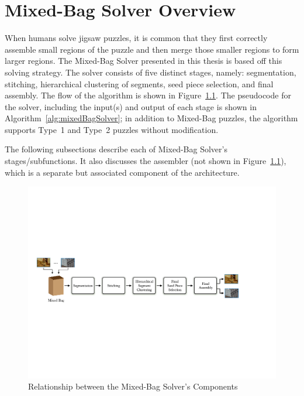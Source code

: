 \chapter{Mixed-Bag Solver Overview}\label{chap:mixedBagSolver}

When humans solve jigsaw puzzles, it is common that they first correctly assemble small regions of the puzzle and then merge those smaller regions to form larger regions.  The Mixed-Bag Solver presented in this thesis is based off this solving strategy.  The solver consists of five distinct stages, namely: segmentation, stitching, hierarchical clustering of segments, seed piece selection, and final assembly.  The flow of the algorithm is shown in Figure~\ref{fig:multipuzzleSolverArchitecture}.  The pseudocode for the solver, including the input(s) and output of each stage is shown in Algorithm~\ref{alg:mixedBagSolver}; in addition to Mixed-Bag puzzles, the algorithm supports Type~1 and Type~2 puzzles without modification. 

The following subsections describe each of Mixed-Bag Solver's stages/subfunctions.  It also discusses the assembler (not shown in Figure~\ref{fig:multipuzzleSolverArchitecture}), which is a separate but associated component of the architecture.

\begin{figure}[ht!]
	\centering
		\includegraphics[width=1.0\textwidth]{images/cropped_algorithm_structure_overview.pdf}
	\caption{Relationship between the Mixed-Bag Solver's Components}\label{fig:multipuzzleSolverArchitecture}
\end{figure}

